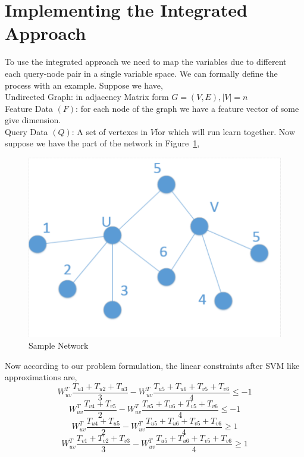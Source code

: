 \documentclass{article}
\begin{document}
\section*{Implementing the Integrated Approach}
To use the integrated approach we need to map the variables due to different each query-node pair in a single variable space. We can formally define the process with an example. Suppose we have,
\\Undirected Graph: in adjacency Matrix form $G = (V, E), |V| = n$
\\Feature Data $(F)$: for each node of the graph we have a feature vector of some give dimension.
\\Query Data $(Q)$: A set of vertexes in $V$for which will run learn together.
Now suppose we have the part of the network in Figure~\ref{fig:Sample Network},
\begin{figure}
\centering
\includegraphics[width=\textwidth,height=\textheight,keepaspectratio]{network.png}
\caption{Sample Network}
\label{fig:Sample Network}
\end{figure}

Now according to our problem formulation, the linear constraints after SVM like approximations  are,
\begin{equation}
W_{uv}^T \frac{T_{u1} + T_{u2} + T_{u3}}{3} - W_{uv}^T \frac {T_{u5} + T_{u6}+T_{v5} + T_{v6}}{4} \leq -1 
\end{equation}
\begin{equation}
W_{uv}^T \frac{T_{v4} + T_{v5}}{2} - W_{uv}^T \frac {T_{u5} + T_{u6}+T_{v5} + T_{v6}}{4} \leq -1 
\end{equation}
\begin{equation}
W_{uv}^T \frac{T_{u4} + T_{u5}}{2} - W_{uv}^T \frac {T_{u5} + T_{u6}+T_{v5} + T_{v6}}{4} \geq 1 
\end{equation}
\begin{equation}
W_{uv}^T \frac{T_{v1} + T_{v2} + T_{v3}}{3} - W_{uv}^T \frac {T_{u5} + T_{u6}+T_{v5} + T_{v6}}{4} \geq 1 
\end{equation}
\end{document}
